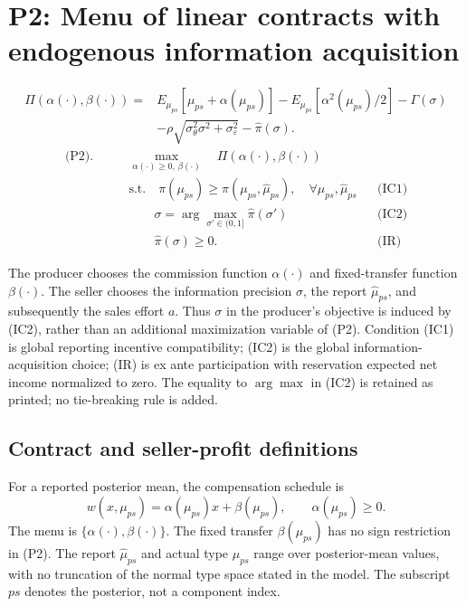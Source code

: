\documentclass{article}
\begin{document}
\section*{P2: Menu of linear contracts with endogenous information acquisition}

\begin{equation*}
\begin{aligned}
\Pi(\alpha(\cdot),\beta(\cdot))
={}&E_{\mu_{ps}}[\mu_{ps}+\alpha(\mu_{ps})]
-E_{\mu_{ps}}[\alpha^2(\mu_{ps})/2]
-\Gamma(\sigma)\\
&-\rho\sqrt{\sigma_\theta^2\sigma^2+\sigma_\varepsilon^2}
-\widehat{\pi}(\sigma).
\end{aligned}
\end{equation*}
\begin{equation*}
\begin{aligned}
\text{(P2).}\qquad
&\max_{\alpha(\cdot)\geq 0,\,\beta(\cdot)}
\quad \Pi(\alpha(\cdot),\beta(\cdot))\\
&\text{s.t.}\quad
\pi(\mu_{ps})\geq\pi(\mu_{ps},\widehat{\mu}_{ps}),
\quad\forall\mu_{ps},\widehat{\mu}_{ps}
&&\text{(IC1)}\\
&\qquad\sigma=\arg\max_{\sigma'\in(0,1]}\widehat{\pi}(\sigma')
&&\text{(IC2)}\\
&\qquad\widehat{\pi}(\sigma)\geq 0.
&&\text{(IR)}
\end{aligned}
\end{equation*}

The producer chooses the commission function $\alpha(\cdot)$ and fixed-transfer function $\beta(\cdot)$. The seller chooses the information precision $\sigma$, the report $\widehat{\mu}_{ps}$, and subsequently the sales effort $a$. Thus $\sigma$ in the producer's objective is induced by (IC2), rather than an additional maximization variable of (P2). Condition (IC1) is global reporting incentive compatibility; (IC2) is the global information-acquisition choice; (IR) is ex ante participation with reservation expected net income normalized to zero. The equality to $\arg\max$ in (IC2) is retained as printed; no tie-breaking rule is added.

\subsection*{Contract and seller-profit definitions}

For a reported posterior mean, the compensation schedule is
\begin{equation*}
w(x,\mu_{ps})=\alpha(\mu_{ps})x+\beta(\mu_{ps}),
\qquad \alpha(\mu_{ps})\geq 0.
\end{equation*}
The menu is $\{\alpha(\cdot),\beta(\cdot)\}$. The fixed transfer $\beta(\mu_{ps})$ has no sign restriction in (P2). The report $\widehat{\mu}_{ps}$ and actual type $\mu_{ps}$ range over posterior-mean values, with no truncation of the normal type space stated in the model. The subscript $ps$ denotes the posterior, not a component index.
\end{document}
